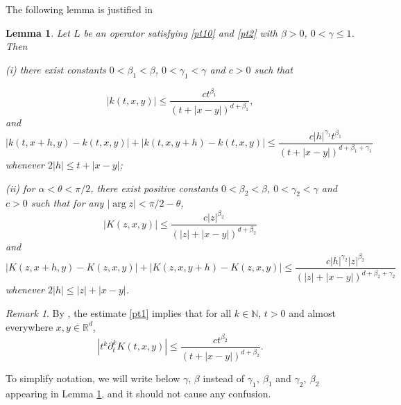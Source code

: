 \documentclass[oneside,english,a4wide]{amsart}
\numberwithin{equation}{section}
\numberwithin{figure}{section}
\theoremstyle{plain}
\theoremstyle{plain}
\theoremstyle{definition}
\theoremstyle{plain}
\newtheorem{lemma}[thm]{Lemma}
\theoremstyle{remark}
\theoremstyle{definition}
\theoremstyle{remark}
\newtheorem{remark}[thm]{Remark}
\theoremstyle{definition}
\newcommand{\real}{{\mathbb R}}
\newcommand{\nat}{{\mathbb N}}
\newcommand{\8}{+\infty}
\renewcommand{\1}{\mathbbm{1}}
\newcommand\jdz[1]{ \left| #1 \right| }
\begin{document}
The following lemma is justified in \cite[Lemma 6.9]{DXT}
\begin{lemma}\label{2.8}
Let $ L $ be an operator satisfying \eqref{pt10} and \eqref{pt2} with $\beta>0$, $ 0 <\gamma \leq 1  $. Then

{\rm (i)} there exist constants $ 0 < \beta_1 < \beta $, $ 0< \gamma_1 < \gamma $ and $c>0$  such that

    \begin{equation}\label{qt1}
         |k(t, x, y)| \leq \frac{ct^{\beta_1}}{(t + |x-y|)^{d+\beta_1}},
    \end{equation}
and
\[
    | k(t, x+h, y) - k(t, x, y) | + | k(t, x, y+h) - k(t, x, y) | \leq \frac{c|h|^{\gamma_1} t^{\beta_1}}{(t + |x-y|)^{d+\beta_1+\gamma_1}}
\]
whenever $ 2|h| \leq t + |x-y| $;

{\rm (ii)} for $\alpha < \theta < \pi/2$, there exist positive constants $ 0 < \beta_2< \beta $, $ 0< \gamma_2 < \gamma $ and $c>0$ such that for any $|\arg z| < \pi/2 - \theta$,
\begin{equation}\label{pt1}
    |K(z, x, y)| \leq \frac{c |z|^{\beta_2}}{(|z| + |x - y|)^{d + \beta_2}}
\end{equation}
and
\[
    | K(z, x+h, y) - K(z, x, y) | + | K(z, x, y+h) - K(z, x, y) | \leq \frac{c|h|^{\gamma_2} |z|^{\beta_2}}{(|z| + |x-y|)^{d+\beta_2+\gamma_2}}
\]
whenever $ 2|h| \leq |z| + |x-y| $.
\end{lemma}


\begin{remark}\label{r2.1}
By \cite[Lemma 2.5]{Coulhon2000}, the estimate \eqref{pt1} implies that for all $k \in \nat$, $t > 0$ and almost everywhere $x, y \in \real^d$,
    \begin{equation}\label{derpt}
        \jdz{ t^k \partial^k_t K(t, x, y) } \leq \frac{c t^{\beta_2} }{(t + |x - y|)^{d + \beta_2}  }.
    \end{equation}
        \end{remark}
        
        {} {To simplify notation, we will write below $\gamma$, $\beta$ instead of $\gamma_1, \ \beta_1$ and $\gamma_2, \ \beta_2$ appearing in Lemma \ref{2.8}, and it should not cause any confusion.}
        
\end{document}
